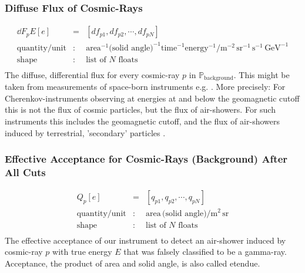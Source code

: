 \documentclass{article}%
\begin{document}
        \subsubsection*{Diffuse Flux of Cosmic-Rays}
            \begin{eqnarray*}
                \dd{F_p}{E}[e] &=& [df_{p1}, df_{p2}, \cdots, df_{pN}]\\
                \text{quantity}/\text{unit} &:& \text{area}^{-1} \text{(solid angle)}^{-1} \text{time}^{-1} \text{energy}^{-1} / \text{m}^{-2}\, \text{sr}^{-1}\,\text{s}^{-1}\,\text{GeV}^{-1}\\
                \text{shape} &:& \text{list of}\,\,N\,\,\text{floats}\\
            \end{eqnarray*}
            The diffuse, differential flux for every cosmic-ray $p$ in $\mathbb{P}_\text{background}$. This might be taken from measurements of space-born instruments e.g. \cite{aguilar2014precision,aguilar2015precision}.
            More precisely: For Cherenkov-instruments observing at energies at and below the geomagnetic cutoff this is not the flux of cosmic particles, but the flux of air-showers.
            For such instruments this includes the geomagnetic cutoff, and the flux of air-showers induced by terrestrial, 'secondary' particles \cite{lipari2002fluxes}.
        \subsubsection*{Effective Acceptance for Cosmic-Rays (Background) After All Cuts}
            \begin{eqnarray*}
                Q_p[e] &=& [q_{p1}, q_{p2}, \cdots, q_{pN}]\\
                \text{quantity}/\text{unit} &:& \text{area} \, \text{(solid angle)} / \text{m}^{2}\,\text{sr}\\
                \text{shape} &:& \text{list of}\,\,N\,\,\text{floats}\\
            \end{eqnarray*}
            The effective acceptance of our instrument to detect an air-shower induced by cosmic-ray $p$ with true energy $E$ that was falsely classified to be a gamma-ray.
            Acceptance, the product of area and solid angle, is also called etendue.
\end{document}
